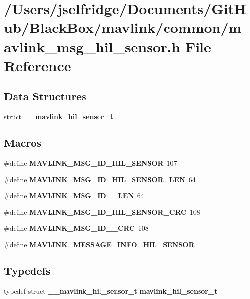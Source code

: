 \section{/\+Users/jselfridge/\+Documents/\+Git\+Hub/\+Black\+Box/mavlink/common/mavlink\+\_\+msg\+\_\+hil\+\_\+sensor.h File Reference}
\label{mavlink__msg__hil__sensor_8h}
\subsection*{Data Structures}
\begin{DoxyCompactItemize}
\item 
struct \textbf{ \+\_\+\+\_\+mavlink\+\_\+hil\+\_\+sensor\+\_\+t}
\end{DoxyCompactItemize}
\subsection*{Macros}
\begin{DoxyCompactItemize}
\item 
\#define \textbf{ M\+A\+V\+L\+I\+N\+K\+\_\+\+M\+S\+G\+\_\+\+I\+D\+\_\+\+H\+I\+L\+\_\+\+S\+E\+N\+S\+OR}~107
\item 
\#define \textbf{ M\+A\+V\+L\+I\+N\+K\+\_\+\+M\+S\+G\+\_\+\+I\+D\+\_\+\+H\+I\+L\+\_\+\+S\+E\+N\+S\+O\+R\+\_\+\+L\+EN}~64
\item 
\#define \textbf{ M\+A\+V\+L\+I\+N\+K\+\_\+\+M\+S\+G\+\_\+\+I\+D\+\_\+\_\+\+L\+EN}~64
\item 
\#define \textbf{ M\+A\+V\+L\+I\+N\+K\+\_\+\+M\+S\+G\+\_\+\+I\+D\+\_\+\+H\+I\+L\+\_\+\+S\+E\+N\+S\+O\+R\+\_\+\+C\+RC}~108
\item 
\#define \textbf{ M\+A\+V\+L\+I\+N\+K\+\_\+\+M\+S\+G\+\_\+\+I\+D\+\_\+\_\+\+C\+RC}~108
\item 
\#define \textbf{ M\+A\+V\+L\+I\+N\+K\+\_\+\+M\+E\+S\+S\+A\+G\+E\+\_\+\+I\+N\+F\+O\+\_\+\+H\+I\+L\+\_\+\+S\+E\+N\+S\+OR}
\end{DoxyCompactItemize}
\subsection*{Typedefs}
\begin{DoxyCompactItemize}
\item 
typedef struct \textbf{ \+\_\+\+\_\+mavlink\+\_\+hil\+\_\+sensor\+\_\+t} \textbf{ mavlink\+\_\+hil\+\_\+sensor\+\_\+t}
\end{DoxyCompactItemize}


